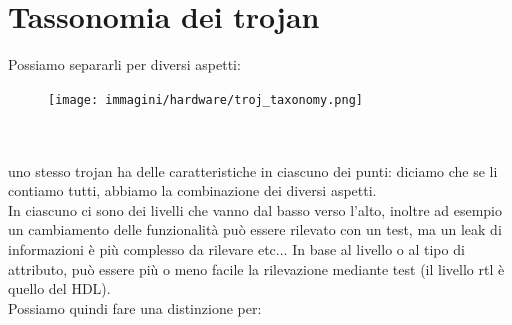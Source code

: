 \documentclass[oneside, 12pt]{extbook}
\begin{document}
\section{Tassonomia dei trojan}
Possiamo separarli per diversi aspetti:\\
\begin{figure}[!h]
	\texttt{[image: immagini/hardware/troj\_taxonomy.png]}
\end{figure}
\\\\uno stesso trojan ha delle caratteristiche in ciascuno dei punti: diciamo che se li contiamo tutti, abbiamo la combinazione dei diversi aspetti.
\\In ciascuno ci sono dei livelli che vanno dal basso verso l'alto, inoltre ad esempio un cambiamento delle funzionalità può essere rilevato con un test, ma un leak di informazioni è più complesso da rilevare etc... In base al livello o al tipo di attributo, può essere più o meno facile la rilevazione mediante test (il livello rtl è quello del HDL).
\\Possiamo quindi fare una distinzione per:
\end{document}
